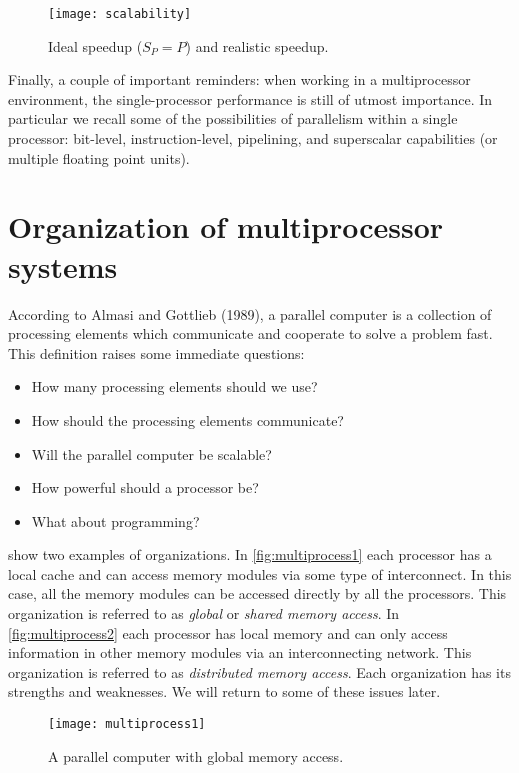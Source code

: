 \begin{figure}[htbp]
  \begin{center}
    \texttt{[image: scalability]}
  \end{center}
  \caption{Ideal speedup ($S_P = P$) and realistic speedup.}
  \label{fig:scalability}
\end{figure}

Finally, a couple of important reminders: when working in a multiprocessor
environment, the single-processor performance is still of utmost importance. In
particular we recall some of the possibilities of parallelism within a single
processor: bit-level, instruction-level, pipelining, and superscalar
capabilities (or multiple floating point units).

\section{Organization of multiprocessor systems}

According to Almasi and Gottlieb (1989), a parallel computer is a collection of
processing elements which communicate and cooperate to solve a problem fast.
This definition raises some immediate questions:
\begin{itemize}
\item How many processing elements should we use?
\item How should the processing elements communicate?
\item Will the parallel computer be scalable?
\item How powerful should a processor be?
\item What about programming?
\end{itemize}

 show two examples of
organizations. In \autoref{fig:multiprocess1} each processor has a local cache
and can access memory modules via some type of interconnect. In this case, all
the memory modules can be accessed directly by all the processors. This
organization is referred to as \emph{global} or \emph{shared memory access}. In
\autoref{fig:multiprocess2} each processor has local memory and can only access
information in other memory modules via an interconnecting network. This
organization is referred to as \emph{distributed memory access}. Each
organization has its strengths and weaknesses. We will return to some of these
issues later.

\begin{figure}[htbp]
  \begin{center}
    \texttt{[image: multiprocess1]}
  \end{center}
  \caption{A parallel computer with global memory access.}
  \label{fig:multiprocess1}
\end{figure}

